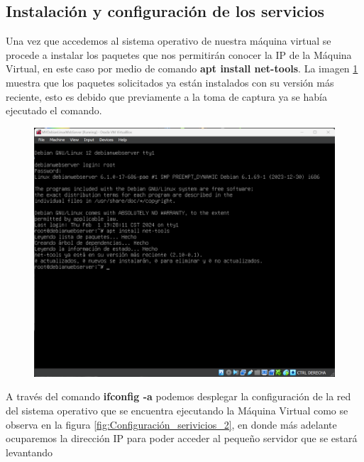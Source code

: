 \documentclass[12pt,a4paper]{article}
\begin{document}
\begin{itemize}
\section{Instalación y configuración de los servicios}

Una vez que accedemos al sistema operativo de nuestra máquina virtual se procede a instalar los paquetes que nos permitirán conocer la IP de la Máquina Virtual, en este caso por medio de comando \textbf{apt install net-tools}. La imagen \ref{fig:Configuración_serivicios_1} muestra que los paquetes solicitados ya están instalados con su versión más reciente, esto es debido que previamente a la toma de captura ya se había ejecutado el comando.


\begin{figure}[H]
    \centering
    \includegraphics[width=1\linewidth]{M3_Virtualización_y_Contenedores/Tarea_2_Máquina_Virtual_Local/reporte/figuras/4-1_Configuración_servicios.png}
    \label{fig:Configuración_serivicios_1}
\end{figure}


A través del comando \textbf{ifconfig -a} podemos desplegar la configuración de la red del sistema operativo que se encuentra ejecutando la Máquina Virtual como se observa en la figura \ref{fig:Configuración_serivicios_2}, en donde más adelante ocuparemos la dirección IP para poder acceder al pequeño servidor que se estará levantando



\end{itemize}
\end{document}
